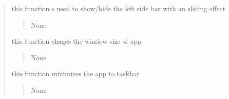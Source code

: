 \documentclass[letterpaper,10pt,english]{sphinxmanual}
\begin{document}
\begin{quote}
\begin{savenotes}
\begin{fulllineitems}
\begin{savenotes}\begin{fulllineitems}
\label{\detokenize{setting/setting_UI:oxin.setting_UI.UI_main_window.leftmenu}}
\pysigstartsignatures
{}
\pysigstopsignatures
\sphinxAtStartPar
this function s used to show/hide the left side bar with an sliding effect
\begin{quote}\begin{description}
\sphinxAtStartPar
None

\end{description}\end{quote}

\end{fulllineitems}\end{savenotes}


\begin{savenotes}\begin{fulllineitems}
\label{\detokenize{setting/setting_UI:oxin.setting_UI.UI_main_window.maxmize_minimize}}
\pysigstartsignatures
{}
\pysigstopsignatures
\sphinxAtStartPar
this function chages the window size of app
\begin{quote}\begin{description}
\sphinxAtStartPar
None

\end{description}\end{quote}

\end{fulllineitems}\end{savenotes}


\begin{savenotes}\begin{fulllineitems}
\label{\detokenize{setting/setting_UI:oxin.setting_UI.UI_main_window.minimize_win}}
\pysigstartsignatures
{}
\pysigstopsignatures
\sphinxAtStartPar
this function minimizes the app to taskbar
\begin{quote}\begin{description}
\sphinxAtStartPar
None


\end{description}
\end{quote}
\end{fulllineitems}
\end{savenotes}
\end{fulllineitems}
\end{savenotes}
\end{quote}
\end{document}
